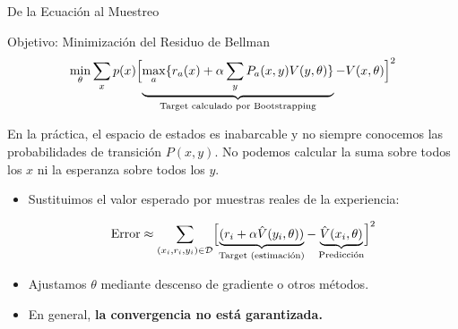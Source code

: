 \documentclass[xcolor=dvipsnames, handout]{beamer}
\begin{document}
\begin{frame}{De la Ecuaci\'on al Muestreo}
\begin{block}{Objetivo: Minimizaci\'on del Residuo de Bellman}
\small
\[ \min_\theta \sum_x p(x) \Bigl[ \underbrace{\max_a \{ r_a(x) + \alpha \sum_y P_a(x,y) V(y,\theta) \}}_{\text{Target calculado por Bootstrapping}} - V(x,\theta) \Bigr]^2 \]
\end{block}
En la pr\'actica, el espacio de estados es inabarcable y no siempre conocemos las probabilidades de transici\'on $P(x,y)$. No podemos calcular la suma sobre todos los $x$ ni la esperanza sobre todos los $y$.

\begin{itemize}
    \item<2->Sustituimos el valor esperado por muestras reales de la experiencia:
    \begin{small}
    \[ \text{Error} \approx \sum_{(x_i, r_i, y_i) \in \mathcal{D}} \Bigl[ \underbrace{(r_i + \alpha \hat{V}(y_i, \theta))}_{\text{Target (estimaci\'on)}} - \underbrace{\hat{V}(x_i, \theta)}_{\text{Predicci\'on}} \Bigr]^2 \]
    \end{small}
    \item<3->Ajustamos $\theta$ mediante descenso de gradiente o otros m\'etodos.
\item<4-> En general, \textbf{la convergencia no est\'a garantizada.}
\end{itemize}

\end{frame}

%
%    
%
\end{document}
